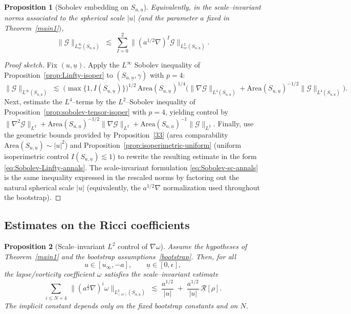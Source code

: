 \documentclass{amsart}
\newtheorem{proposition}{Proposition}[section]
\newcommand{\aln}{(\al \nabla)^i}
\newcommand{\al}{a^{\frac{1}{2}}}
\newcommand{\ubar}{\underline{u}}
\newcommand{\scaletwoSu}[1]{\lVert{#1} \rVert_{L^2_{(sc)}(S_{u,\ubar})}}
\begin{document}
{\begin{proposition}[Sobolev embedding on $S_{u,\ubar}$]
\noindent Equivalently, in the scale--invariant norms associated to the spherical scale $|u|$ (and the parameter $a$ fixed in Theorem~\ref{main1}$)$,
\begin{equation}\label{eq:Sobolev-sc-annals}
\|\mathcal G\|_{L^\infty_{sc}(S_{u,\ubar})}
\;\lesssim\;
\sum_{I=0}^{2}\big\|(a^{1/2}\nabla)^{I}\mathcal G\big\|_{L^{2}_{sc}(S_{u,\ubar})}.
\end{equation}
\end{proposition}

\begin{proof}[Proof sketch]
Fix $(u,\ubar)$. Apply the $L^\infty$ Sobolev inequality of Proposition~\ref{prop:Linfty-isoper} to $(S_{u,\ubar},\gamma)$ with $p=4$:
\[
\|\mathcal G\|_{L^\infty(S_{u,\ubar})}
\;\lesssim\;
\big(\max\{1,I(S_{u,\ubar})\}\big)^{1/2}\,
\text{Area}(S_{u,\ubar})^{1/4}
\Big(
\|\nabla\mathcal G\|_{L^4(S_{u,\ubar})}
+
\text{Area}(S_{u,\ubar})^{-1/2}\|\mathcal G\|_{L^4(S_{u,\ubar})}
\Big).
\]
Next, estimate the $L^4$--terms by the $L^2$--Sobolev inequality of Proposition~\ref{prop:sobolev-tensor-isoper} with $p=4$, yielding control by
$\|\nabla^2\mathcal G\|_{L^2}+\text{Area}(S_{u,\ubar})^{-1/2}\|\nabla\mathcal G\|_{L^2}+\text{Area}(S_{u,\ubar})^{-1}\|\mathcal G\|_{L^2}$.
Finally, use the geometric bounds provided by Proposition~\ref{33} (area comparability $\text{Area}(S_{u,\ubar})\sim |u|^2$) and Proposition~\ref{prop:isoperimetric-uniform} (uniform isoperimetric control $I(S_{u,\ubar})\lesssim 1$) to rewrite the resulting estimate in the form \eqref{eq:Sobolev-Linfty-annals}. The scale-invariant formulation \eqref{eq:Sobolev-sc-annals} is the same inequality expressed in the rescaled norms by factoring out the natural spherical scale $|u|$ (equivalently, the $a^{1/2}\nabla$ normalization used throughout the bootstrap).
\end{proof}


\subsection{Estimates on the Ricci coefficients}



\begin{proposition}[Scale--invariant $L^{2}$ control of $\nabla\omega$]\label{omegaprop}
Assume the hypotheses of Theorem~\ref{main1} and the bootstrap assumptions~\eqref{bootstrap}. Then, for all
\[
u\in[u_\infty,-a],\qquad \ubar\in[0,\epsilon],
\]
the lapse/vorticity coefficient $\omega$ satisfies the scale--invariant estimate
\begin{equation}\label{eq:omega-prop-annals}
\sum_{i\le N+4}\,\scaletwoSu{\aln\omega}
\;\lesssim\;
\frac{a^{1/2}}{|u|}
\;+\;
\frac{a^{1/2}}{|u|}\,\underline{\mathcal R}[\rho].
\end{equation}
The implicit constant depends only on the fixed bootstrap constants and on $N$.
\end{proposition}

}
\end{document}

